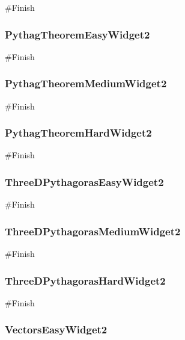 \begin{landscape}
\begin{python}
#Finish
\end{python}

\subsubsection{PythagTheoremEasyWidget2}

\begin{python}
#Finish
\end{python}

\subsubsection{PythagTheoremMediumWidget2}

\begin{python}
#Finish
\end{python}

\subsubsection{PythagTheoremHardWidget2}

\begin{python}
#Finish
\end{python}

\subsubsection{ThreeDPythagorasEasyWidget2}

\begin{python}
#Finish
\end{python}

\subsubsection{ThreeDPythagorasMediumWidget2}

\begin{python}
#Finish
\end{python}

\subsubsection{ThreeDPythagorasHardWidget2}

\begin{python}
#Finish
\end{python}

\subsubsection{VectorsEasyWidget2}


\end{landscape}
